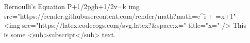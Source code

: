  Bernoulli's Equation
 P+1/2pgh+1/2v=k
img src="https://render.githubusercontent.com/render/math?math=e^{i +\pi} =x+1"
<img src="https://latex.codecogs.com/svg.latex?\Large&space;x=" title="\Large x=" />
This is some <sub>subscript</sub> text.

